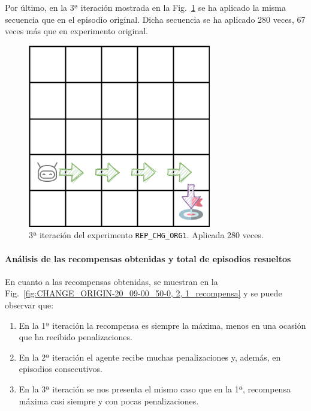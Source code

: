 Por último, en la 3ª iteración mostrada en la Fig.~\ref{fig:dim5_CHANGE_ORIGIN-20-09_00-42-50_0, 2, 1_3iter} se ha aplicado la misma secuencia que en el episodio original. Dicha secuencia se ha aplicado 280 veces, 67 veces más que en experimento original. 
 
\begin{figure}
    \centering
    \includegraphics[scale=0.4]{cap5_experimentacion/images/dim5_CHANGE_ORIGIN-20-09_00-42-50_213.png}
    \caption{3ª iteración del experimento \texttt{REP\_CHG\_ORG1}. Aplicada 280 veces.}
    \label{fig:dim5_CHANGE_ORIGIN-20-09_00-42-50_0, 2, 1_3iter}
\end{figure}

\paragraph{Análisis de las recompensas obtenidas y total de episodios resueltos} 

En cuanto a las recompensas obtenidas, se muestran en la Fig.~\ref{fig:CHANGE_ORIGIN-20_09-00_50-0, 2, 1_recompensa} y se puede observar que: 
\begin{enumerate}
    \item En la 1ª iteración la recompensa es siempre la máxima, menos en una ocasión que ha recibido penalizaciones.  
    \item En la 2ª iteración el agente recibe muchas penalizaciones y, además, en episodios consecutivos.
    \item En la 3ª iteración se nos presenta el mismo caso que en la 1ª, recompensa máxima casi siempre y con pocas penalizaciones. 
\end{enumerate}

